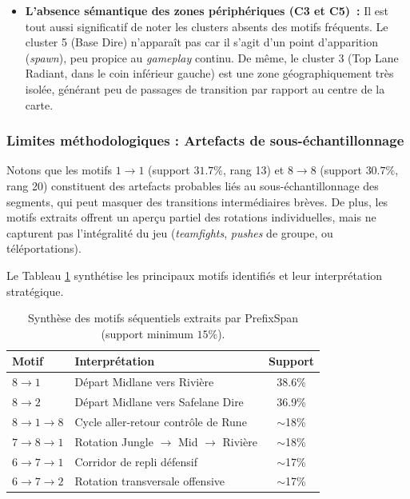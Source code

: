 \documentclass[11pt, a4paper]{article}
\begin{document}
\begin{itemize}
    \item \textbf{L'absence sémantique des zones périphériques (C3 et C5)~:}
    Il est tout aussi significatif de noter les clusters absents des motifs fréquents. Le cluster 5 (Base Dire) n'apparaît pas car il s'agit d'un point d'apparition (\textit{spawn}), peu propice au \textit{gameplay} continu. De même, le cluster 3 (Top Lane Radiant, dans le coin inférieur gauche) est une zone géographiquement très isolée, générant peu de passages de transition par rapport au centre de la carte.
\end{itemize}

\subsubsection*{Limites méthodologiques : Artefacts de sous-échantillonnage}
Notons que les motifs $1 \rightarrow 1$ (support $31.7\%$, rang 13) et $8 \rightarrow 8$ (support $30.7\%$, rang 20) constituent des artefacts probables liés au sous-échantillonnage des segments, qui peut masquer des transitions intermédiaires brèves. De plus, les motifs extraits offrent un aperçu partiel des rotations individuelles, mais ne capturent pas l'intégralité du jeu (\textit{teamfights}, \textit{pushes} de groupe, ou téléportations).

Le Tableau \ref{tab:motifs} synthétise les principaux motifs identifiés et leur interprétation stratégique.

\begin{table}[H]
\centering
\caption{Synthèse des motifs séquentiels extraits par PrefixSpan (support minimum $15\%$).}
\label{tab:motifs}
\begin{tabular}{llc}
\toprule
\textbf{Motif} & \textbf{Interprétation} & \textbf{Support} \\
\midrule
$8 \rightarrow 1$ & Départ Midlane vers Rivière & 38.6\% \\
$8 \rightarrow 2$ & Départ Midlane vers Safelane Dire & 36.9\% \\
$8 \rightarrow 1 \rightarrow 8$ & Cycle aller-retour contrôle de Rune & $\sim$18\% \\
$7 \rightarrow 8 \rightarrow 1$ & Rotation Jungle $\rightarrow$ Mid $\rightarrow$ Rivière & $\sim$18\% \\
$6 \rightarrow 7 \rightarrow 1$ & Corridor de repli défensif & $\sim$17\% \\
$6 \rightarrow 7 \rightarrow 2$ & Rotation transversale offensive & $\sim$17\% \\
\bottomrule
\end{tabular}
\end{table}
\end{document}
